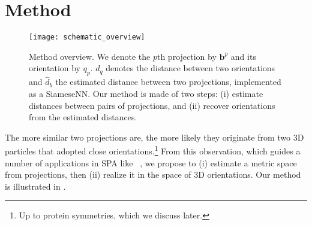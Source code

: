 \section{Method}

\begin{figure}
    \centering
    \texttt{[image: schematic\_overview]}
    \caption{
        Method overview.
        We denote the $p$th projection by $\mathbf{b}^p$ and its orientation by $q_p$.
        $d_q$ denotes the distance between two orientations and $\widehat{d}_b$ the estimated distance between two projections, implemented as a SiameseNN.
        Our method is made of two steps: (i) estimate distances between pairs of projections, and (ii) recover orientations from the estimated distances.
    }
    \label{fig:schematic:overview}
\end{figure}

The more similar two projections are, the more likely they originate from two 3D particles that adopted close orientations.\footnote{Up to protein symmetries, which we discuss later.}
From this observation, which guides a number of applications in SPA like~\cite{penczek1994ribosome} , we propose to (i) estimate a metric space from projections, then (ii) realize it in the space of 3D orientations.
Our method is illustrated in .

